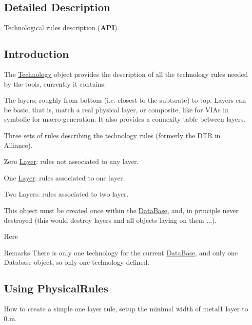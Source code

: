 \subsection{Detailed Description}
Technological rules description ({\bfseries A\+PI}). 

\hypertarget{classHurricane_1_1Technology_sTechnologyIntro}{}\subsection{Introduction}\label{classHurricane_1_1Technology_sTechnologyIntro}
The \mbox{\hyperlink{classHurricane_1_1Technology}{Technology}} object provides the description of all the technology rules needed by the tools, currently it contains\+:


\begin{DoxyItemize}
\item The layers, roughly from bottom (i.\+e. closest to the subtsrate) to top. Layers can be basic, that is, match a real physical layer, or composite, like for V\+I\+As in symbolic for macro-\/generation. It also provides a connexity table between layers.
\item Three sets of rules describing the technology rules (formerly the {\ttfamily D\+TR} in Alliance).
\begin{DoxyEnumerate}
\item {\ttfamily Zero \mbox{\hyperlink{classHurricane_1_1Layer}{Layer}}}\+: rules not associated to any layer.
\item {\ttfamily One \mbox{\hyperlink{classHurricane_1_1Layer}{Layer}}}\+: rules associated to one layer.
\item {\ttfamily Two Layers}\+: rules associated to two layer.
\end{DoxyEnumerate}
\end{DoxyItemize}

This object must be created once within the \mbox{\hyperlink{classHurricane_1_1DataBase}{Data\+Base}}, and, in principle never destroyed (this would destroy layers and all objects laying on them ...).

Here

\begin{DoxyRemark}{Remarks}
There is only one technology for the current \mbox{\hyperlink{classHurricane_1_1DataBase}{Data\+Base}}, and only one Database object, so only one technology defined.
\end{DoxyRemark}
\hypertarget{classHurricane_1_1Technology_sTechnologyRules}{}\subsection{Using Physical\+Rules}\label{classHurricane_1_1Technology_sTechnologyRules}
How to create a simple one layer rule, setup the minimal width of {\ttfamily metal1} layer to 0.m.


